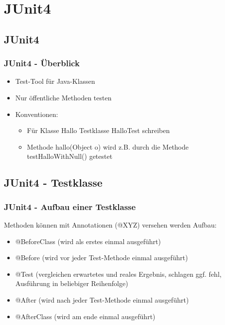 \documentclass[18pt]{beamer}
\begin{document}
		
\section{JUnit4}	
	\subsection{JUnit4}
	\begin{frame}
		\frametitle{JUnit4 - Überblick}
		\begin{itemize}
			\item Test-Tool für Java-Klassen
			\item Nur öffentliche Methoden testen
			\item Konventionen:
			 \begin{itemize}
			 		\item Für Klasse Hallo Testklasse HalloTest schreiben
			 		\item Methode hallo(Object o) wird z.B. durch die Methode testHalloWithNull() getestet
			 \end{itemize}
		\end{itemize}
	\end{frame}	
	
	\subsection{JUnit4 - Testklasse}
	\begin{frame}
		\frametitle{JUnit4 - Aufbau einer Testklasse}
		Methoden können mit Annotationen (@XYZ) versehen werden \linebreak
		Aufbau:
		\begin{itemize}
			\item @BeforeClass (wird als erstes einmal ausgeführt)
			\pause
			\item @Before (wird vor jeder Test-Methode einmal ausgeführt)
			\pause
			\item @Test (vergleichen erwartetes und reales Ergebnis, schlagen ggf. fehl, Ausführung in beliebiger Reihenfolge)
			\pause
			\item @After (wird nach jeder Test-Methode einmal ausgeführt)
			\pause
			\item @AfterClass (wird am ende einmal ausgeführt)
		\end{itemize}
	\end{frame}
	
\end{document}
